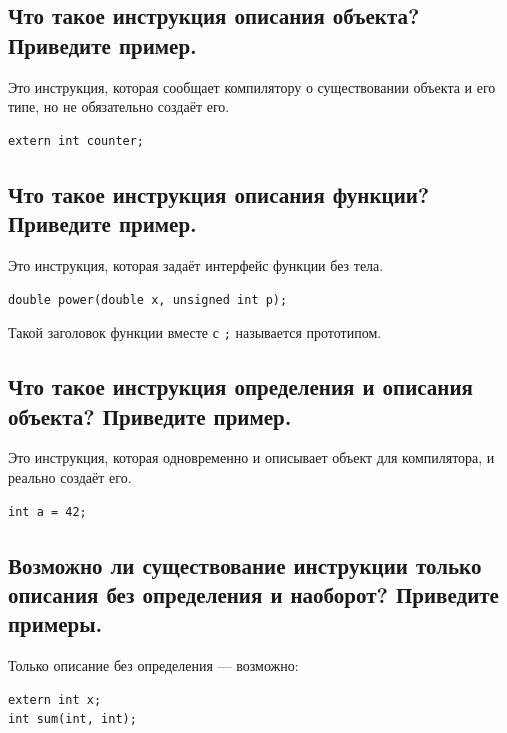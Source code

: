 \subsection{Что такое инструкция описания объекта? Приведите пример.}

Это инструкция, которая сообщает компилятору о существовании объекта и его типе, но не обязательно создаёт его.

\begin{example}
\begin{verbatim}
extern int counter;
\end{verbatim}
\end{example}


\subsection{Что такое инструкция описания функции? Приведите пример.}

Это инструкция, которая задаёт интерфейс функции без тела.

\begin{example}
\begin{verbatim}
double power(double x, unsigned int p);
\end{verbatim}
\end{example}

Такой заголовок функции вместе с \texttt{;} называется прототипом.


\subsection{Что такое инструкция определения и описания объекта? Приведите пример.}

Это инструкция, которая одновременно и описывает объект для компилятора, и реально создаёт его.

\begin{example}
\begin{verbatim}
int a = 42;
\end{verbatim}
\end{example}


\subsection{Возможно ли существование инструкции только описания без определения и наоборот? Приведите примеры.}

Только описание без определения --- возможно:
\begin{verbatim}
extern int x;
int sum(int, int);
\end{verbatim}

